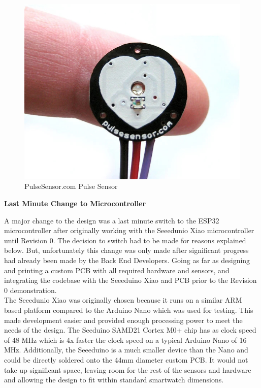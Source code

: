 \documentclass[12pt, titlepage]{article}
\begin{document}
\begin{figure}[H]
\centering
\includegraphics[scale = 0.5]{pulseSensor}
  \caption{PulseSensor.com Pulse Sensor}
  \label{fig:pulseSensor}
\end{figure}

\textbf{Last Minute Change to Microcontroller}

A major change to the design was a last minute switch to the ESP32 microcontroller after originally working with the Seeedunio Xiao microcontroller until Revision 0. The decision to switch had to be made for reasons explained below. But, unfortunately this change was only made after significant progress had already been made by the Back End Developers. Going as far as designing and printing a custom PCB with all required hardware and sensors, and integrating the codebase with the Seeeduino Xiao and PCB prior to the Revision 0 demonstration. \\

The Seeedunio Xiao was originally chosen because it runs on a similar ARM based platform compared to the Arduino Nano which was used for testing. This made development easier and provided enough processing power to meet the needs of the design. The Seeduino SAMD21 Cortex M0+ chip has as clock speed of 48 MHz which is 4x faster the clock speed on a typical Arduino Nano of 16 MHz. Additionally, the Seeeduino is a much smaller device than the Nano and could be directly soldered onto the 44mm diameter custom PCB. It would not take up significant space, leaving room for the rest of the sensors and hardware and allowing the design to fit within standard smartwatch dimensions. \\
\end{document}
